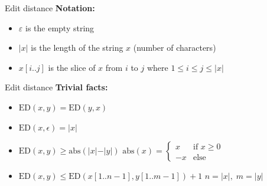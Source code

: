 
\begin{frame}{Edit distance}
  \textbf{Notation:}
  \begin{itemize}
    \item
      $\varepsilon$ is the empty string
    \item
      $\vert x \vert$ is the length of the string $x$ (number of characters)
    \item
      $x[i..j]$ is the slice of $x$ from $i$ to $j$ where
      $1 \leq i \leq j \leq \vert x \vert$
  \end{itemize}
  \begin{figure}[!h]
    \begin{adjustbox}{width=0.75\linewidth}
      
    \end{adjustbox}
  \end{figure}
\end{frame}


\begin{frame}{Edit distance}
  \textbf{Trivial facts:}
  \begin{itemize}
    \item
      $\mathrm{ED}(x, y) = \mathrm{ED}(y, x)$
    \item
      $\mathrm{ED}(x, \epsilon) = \vert x \vert$
    \item
      $\mathrm{ED}(x, y) \geq \mathrm{abs}(\vert x \vert - \vert y \vert)$
      \hfill
      $\mathrm{abs}(x) = \begin{cases}
        x & \text{if } x \geq 0\\
        -x & \text{else}
      \end{cases}$
    \item
      $\mathrm{ED}(x, y) \leq \mathrm{ED}(x[1..n-1], y[1..m-1]) + 1$
      \hfill
      $n = \vert x \vert, \; m = \vert y \vert$
  \end{itemize}
\end{frame}


